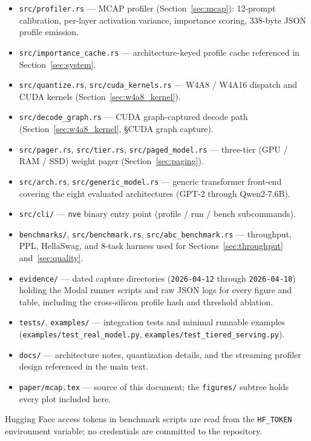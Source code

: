 \documentclass{article}
\begin{document}
\begin{itemize}[leftmargin=*, itemsep=1pt]
\item \texttt{src/profiler.rs} --- MCAP profiler
  (Section~\ref{sec:mcap}): 12-prompt calibration, per-layer
  activation variance, importance scoring, 338-byte JSON profile emission.
\item \texttt{src/importance\_cache.rs} --- architecture-keyed profile
  cache referenced in Section~\ref{sec:system}.
\item \texttt{src/quantize.rs}, \texttt{src/cuda\_kernels.rs} ---
  W4A8 / W4A16 dispatch and CUDA kernels
  (Section~\ref{sec:w4a8_kernel}).
\item \texttt{src/decode\_graph.rs} --- CUDA graph-captured decode path
  (Section~\ref{sec:w4a8_kernel}, \S CUDA graph capture).
\item \texttt{src/pager.rs}, \texttt{src/tier.rs},
  \texttt{src/paged\_model.rs} --- three-tier (GPU / RAM / SSD) weight
  pager (Section~\ref{sec:paging}).
\item \texttt{src/arch.rs}, \texttt{src/generic\_model.rs} --- generic
  transformer front-end covering the eight evaluated architectures
  (GPT-2 through Qwen2-7.6B).
\item \texttt{src/cli/} --- \texttt{nve} binary entry point
  (profile / run / bench subcommands).
\item \texttt{benchmarks/}, \texttt{src/benchmark.rs},
  \texttt{src/abc\_benchmark.rs} --- throughput, PPL, HellaSwag, and
  8-task harness used for Sections~\ref{sec:throughput}
  and~\ref{sec:quality}.
\item \texttt{evidence/} --- dated capture directories
  (\texttt{2026-04-12} through \texttt{2026-04-18}) holding the Modal
  runner scripts and raw JSON logs for every figure and table,
  including the cross-silicon profile hash and threshold ablation.
\item \texttt{tests/}, \texttt{examples/} --- integration tests and
  minimal runnable examples (\texttt{examples/test\_real\_model.py},
  \texttt{examples/test\_tiered\_serving.py}).
\item \texttt{docs/} --- architecture notes, quantization details, and
  the streaming profiler design referenced in the main text.
\item \texttt{paper/mcap.tex} --- source of this document; the
  \texttt{figures/} subtree holds every plot included here.
\end{itemize}

Hugging Face access tokens in benchmark scripts are read from the
\texttt{HF\_TOKEN} environment variable; no credentials are committed to
the repository.
\end{document}
